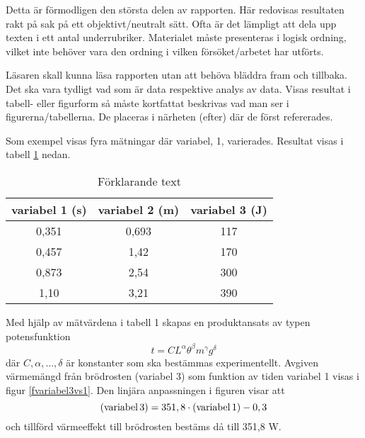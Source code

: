 
Detta är förmodligen den största delen av rapporten. Här redovisas resultaten rakt på sak på ett objektivt/neutralt sätt. Ofta är det lämpligt att dela upp texten i ett antal underrubriker. Materialet måste presenteras i logisk ordning, vilket inte behöver vara den ordning i vilken försöket/arbetet har utförts.

Läsaren skall kunna läsa rapporten utan att behöva bläddra fram och tillbaka. Det ska vara tydligt vad som är data respektive analys av data.
Visas resultat i tabell- eller figurform så måste kortfattat beskrivas vad man ser i figurerna/tabellerna. De placeras i närheten (efter) där de först refererades.

Som exempel visas fyra mätningar där variabel, 1, varierades. Resultat visas i tabell \ref{tvariabel123} nedan.


\begin{table}[ht]
\centering
    \begin{tabular}{c | c | c}
        \hline
        variabel 1 (s) & variabel 2 (m) & variabel 3 (J) \\
        \hline
        0,351 &	0,693 &	117 \\
        0,457 &	1,42 &	170 \\
        0,873 &	2,54 &	300 \\
        1,10 &	3,21 &	390 \\
        \hline
     \end{tabular} 
\caption{Förklarande text}
\label{tvariabel123}
\end{table}

Med hjälp av mätvärdena i tabell 1 skapas en produktansats av typen potensfunktion
\begin{equation}
t = C L^\alpha \theta^\beta m^\gamma g^\delta
\end{equation}
där $C, \alpha, ..., \delta$ är konstanter som ska bestämmas experimentellt.
Avgiven värmemängd från brödrosten (variabel 3) som funktion av tiden variabel 1 visas i figur \ref{fvariabel3vs1}. Den linjära anpassningen i figuren visar att
\begin{equation}
{\rm (variabel \, 3)} = 351,8 \cdot {\rm (variabel \, 1)} - 0,3
\end{equation}
och tillförd värmeeffekt till brödrosten bestäms då till 351,8 W.

